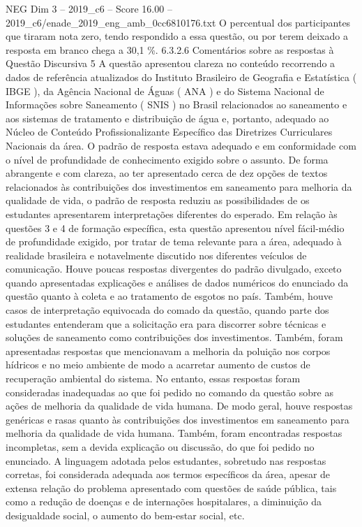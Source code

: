 \begin{textsample}{NEG Dim 3 – 2019\_c6 – Score 16.00 – 2019\_c6/enade\_2019\_eng\_amb\_0cc6810176.txt}
O percentual dos participantes que tiraram nota zero, tendo respondido a essa questão, ou por terem deixado a resposta em branco chega a 30,1 \%. 6.3.2.6 Comentários sobre as respostas à Questão Discursiva 5 A questão apresentou clareza no conteúdo recorrendo a dados de referência atualizados do Instituto Brasileiro de Geografia e Estatística ( IBGE ), da Agência Nacional de Águas ( ANA ) e do Sistema Nacional de Informações sobre Saneamento ( SNIS ) no Brasil relacionados ao saneamento e aos sistemas de tratamento e distribuição de água e, portanto, adequado ao Núcleo de Conteúdo Profissionalizante Específico das Diretrizes Curriculares Nacionais da área.
O padrão de resposta estava adequado e em conformidade com o nível de profundidade de conhecimento exigido sobre o assunto.
De forma abrangente e com clareza, ao ter apresentado cerca de dez opções de textos relacionados às contribuições dos investimentos em saneamento para melhoria da qualidade de vida, o padrão de resposta reduziu as possibilidades de os estudantes apresentarem interpretações diferentes do esperado.
Em relação às questões 3 e 4 de formação específica, esta questão apresentou nível fácil-médio de profundidade exigido, por tratar de tema relevante para a área, adequado à realidade brasileira e notavelmente discutido nos diferentes veículos de comunicação.
Houve poucas respostas divergentes do padrão divulgado, exceto quando apresentadas explicações e análises de dados numéricos do enunciado da questão quanto à coleta e ao tratamento de esgotos no país.
Também, houve casos de interpretação equivocada do comado da questão, quando parte dos estudantes entenderam que a solicitação era para discorrer sobre técnicas e soluções de saneamento como contribuições dos investimentos.
Também, foram apresentadas respostas que mencionavam a melhoria da poluição nos corpos hídricos e no meio ambiente de modo a acarretar aumento de custos de recuperação ambiental do sistema.
No entanto, essas respostas foram consideradas inadequadas ao que foi pedido no comando da questão sobre as ações de melhoria da qualidade de vida humana.
De modo geral, houve respostas genéricas e rasas quanto às contribuições dos investimentos em saneamento para melhoria da qualidade de vida humana.
Também, foram encontradas respostas incompletas, sem a devida explicação ou discussão, do que foi pedido no enunciado.
A linguagem adotada pelos estudantes, sobretudo nas respostas corretas, foi considerada adequada aos termos específicos da área, apesar de extensa relação do problema apresentado com questões de saúde pública, tais como a redução de doenças e de internações hospitalares, a diminuição da desigualdade social, o aumento do bem-estar social, etc.

\end{textsample}
